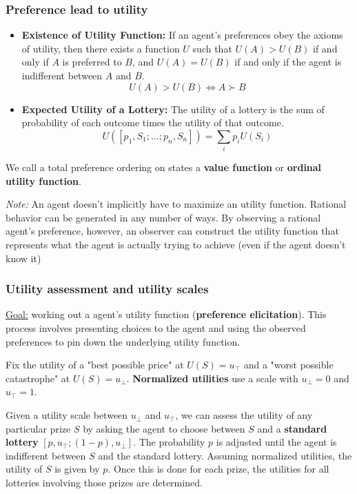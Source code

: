 \documentclass{scrartcl}
\begin{document}
\subsubsection{Preference lead to utility}
\begin{itemize}
    \item
        \textbf{Existence of Utility Function:} If an agent's preferences obey the axioms of utility, then there exists a function \(U\) such that \(U(A) > U(B)\) if and only if \(A\) is preferred to \(B\), and \(U(A) = U(B)\) if and only if the agent is indifferent between \(A\) and \(B\).\\
         \[U(A) > U(B) \Leftrightarrow A \succ B\]
    \item
        \textbf{Expected Utility of a Lottery:} The utility of a lottery is the sum of probability of each outcome times the utility of that outcome.
        \[U([p_1, S_1; \dots; p_n, S_n]) = \sum_i p_i U(S_i)\]
\end{itemize}
We call a total preference ordering on states a \textbf{value function} or \textbf{ordinal utility function}.

\textit{Note:} An agent doesn't implicitly have to maximize an utility function. Rational behavior can be generated in any number of ways. By observing a rational agent's preference, however, an observer can construct the utility function that represents what the agent is actually trying to achieve (even if the agent doesn't know it)

\subsubsection{Utility assessment and utility scales}
\underline{Goal:} working out a agent's utility function (\textbf{preference elicitation}). This process involves presenting choices to the agent and using the observed preferences to pin down the underlying utility function.

Fix the utility of a "best possible price" at \(U(S) = u_{\top}\) and a "worst possible catastrophe" at \(U(S) = u_{\bot}\). \textbf{Normalized utilities} use a scale with \(u_{\bot} = 0\) and \(u_{\top} = 1\).

Given a utility scale between \(u_{\bot}\) and \(u_{\top}\), we can assess the utility of any particular prize \(S\) by asking the agent to choose between \(S\) and a \textbf{standard lottery} \([p, u_{\top}; (1-p), u_{\bot}]\). The probability \(p\) is adjusted until the agent is indifferent between \(S\) and the standard lottery. Assuming normalized utilities, the utility of \(S\) is given by \(p\). Once this is done for each prize, the utilities for all lotteries involving those prizes are determined.
\end{document}
